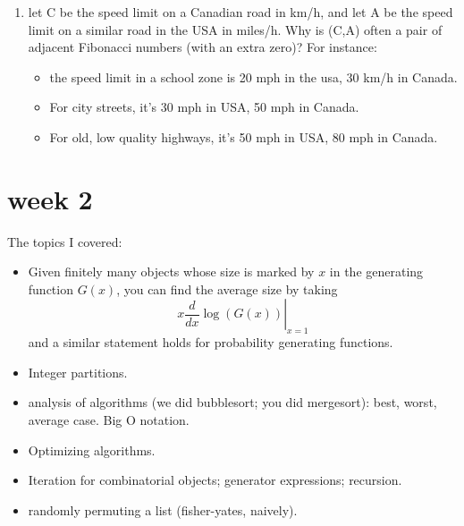 \documentclass[12pt]{article}
\begin{document}
\begin{enumerate}
	\item let C be the speed limit on a Canadian road in km/h, and let A be the speed limit on a similar road in the USA in miles/h.  Why is (C,A) often a pair of adjacent Fibonacci numbers (with an extra zero)?  For instance:
	\begin{itemize}
		\item the speed limit in a school zone is 20 mph in the usa, 30 km/h in Canada.
		\item For city streets, it's 30 mph in USA, 50 mph in Canada.
		\item For old, low quality highways, it's 50 mph in USA, 80 mph in Canada.
	\end{itemize}
\end{enumerate}

\section{week 2}

The topics I covered:
\begin{itemize}
\item Given finitely many objects whose size is marked by $x$ in the generating function $G(x)$, you can find the average size by taking $$\left. x \frac{d}{dx} \log(G(x)) \right|_{x=1}$$ and a similar statement holds for probability generating functions.
\item Integer partitions.
\item analysis of algorithms (we did bubblesort; you did mergesort): best, worst, average case.  Big O notation.
\item Optimizing algorithms.
\item Iteration for combinatorial objects; generator expressions; recursion.
\item randomly permuting a list (fisher-yates, naively).
\end{itemize}
\end{document}
